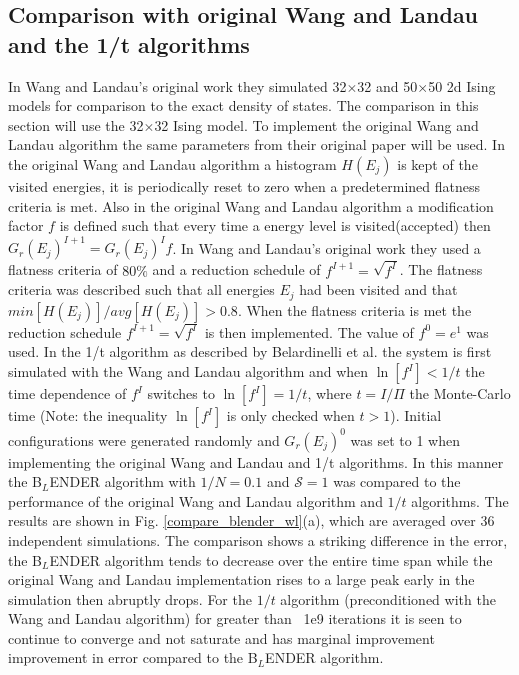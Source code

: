 \documentclass[aps,pre,reprint,superscriptaddress,showkeys]{revtex4-2}
\begin{document}
\subsection{Comparison with original Wang and Landau  and the 1/t algorithms}
In Wang and Landau's original work they simulated  32$\times$32 and 50$\times$50 2d Ising models for comparison to the exact density of states. The comparison in this section will use the 32$\times$32 Ising model. To implement the original Wang and Landau algorithm the same parameters from their original paper will be used\cite{WL_phys_rev_lett}. In the original Wang and Landau algorithm a histogram $H(E_j)$ is kept of the visited energies, it is periodically reset to zero when a predetermined flatness criteria is met. Also in the original Wang and Landau algorithm a  modification factor $f$ is defined such that every time a energy level is visited(accepted) then $G_r(E_j)^{I+1} = G_r(E_j)^{I}f$. In Wang and Landau's original work they used a flatness criteria of $80\%$ and a reduction schedule of $f^{I+1}= \sqrt{f^{I}}$. The flatness criteria was described such that all energies $E_j$ had been visited and that  $min[H(E_j)]/avg[H(E_j)] > 0.8$. When the flatness criteria is met the reduction schedule $f^{I+1}= \sqrt{f^{I}}$ is then implemented. The value of $f^0 = e^1$ was used. In the 1/t algorithm as described by Belardinelli et al. \cite{saturation} the system is first simulated with the Wang and Landau algorithm and when $\ln[f^I]< 1/t$  the time dependence of $f^I$ switches to $\ln[f^I]=1/t$, where $t = I/\Pi$ the Monte-Carlo time (Note: the inequality $\ln[f^I]$ is only checked when $t>1$).  Initial configurations were generated randomly and $G_r(E_j)^0$ was set to 1 when implementing the original Wang and Landau and  1/t algorithms.  In  this manner the B$_L$ENDER algorithm with $1/N = 0.1$ and $\mathcal{S}=1$ was compared to the performance of the original Wang and Landau algorithm and $1/t$ algorithms. The results are shown in Fig. \ref{compare_blender_wl}(a), which are averaged over 36 independent simulations. The comparison shows a striking difference in the error,  the B$_L$ENDER algorithm  tends to decrease over the entire time span while the original Wang and Landau implementation  rises to a large peak early in the simulation then abruptly drops. For the $1/t$ algorithm (preconditioned with the Wang and Landau algorithm) for greater than ~1e9 iterations it is seen to continue to converge and not saturate and has marginal improvement improvement in error compared to the B$_L$ENDER algorithm.    
\end{document}
